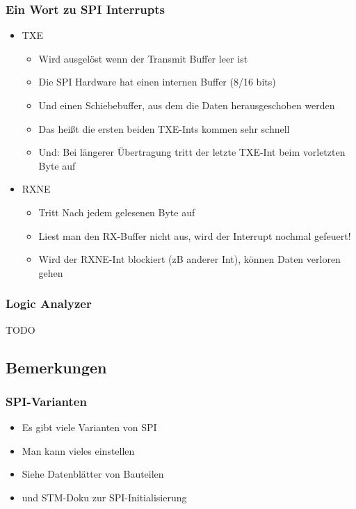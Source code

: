 \documentclass[ngerman,compress]{beamer}
\begin{document}
\begin{frame} [fragile]
	\frametitle{Ein Wort zu SPI Interrupts}
	\begin{itemize}
		\item TXE
		\begin{itemize}
		\item Wird ausgelöst wenn der Transmit Buffer leer ist
		\item Die SPI Hardware hat einen internen Buffer (8/16 bits)
		\item Und einen Schiebebuffer, aus dem die Daten herausgeschoben werden
		\item Das heißt die ersten beiden TXE-Ints kommen sehr schnell
		\item Und: Bei längerer Übertragung tritt der letzte TXE-Int beim vorletzten Byte auf
		\end{itemize}
		\item RXNE
		\begin{itemize}
		\item Tritt Nach jedem gelesenen Byte auf
		\item Liest man den RX-Buffer nicht aus, wird der Interrupt nochmal gefeuert!
		\item Wird der RXNE-Int blockiert (zB anderer Int), können Daten verloren gehen
		\end{itemize}
	\end{itemize}
\end{frame}

\begin{frame} [fragile]
	\frametitle{Logic Analyzer}
	TODO
\end{frame}


\subsection{Bemerkungen}

\begin{frame} [fragile]
	\frametitle{SPI-Varianten}
	\begin{itemize}
		\item Es gibt viele Varianten von SPI
		\item Man kann vieles einstellen
		\item Siehe Datenblätter von Bauteilen
		\item und STM-Doku zur SPI-Initialisierung
	\end{itemize}
\end{frame}
\end{document}
